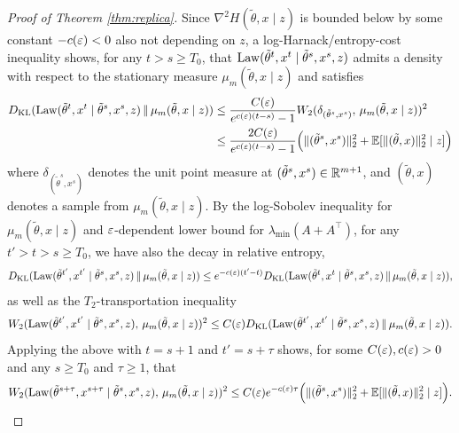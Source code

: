 \begin{proof}[Proof of Theorem \ref{thm:replica}]
Since $\nabla^2 H(\tilde\theta,x \mid z)$ is bounded below by some 
constant ${-}c(\varepsilon)<0$ also not depending on $z$,
a log-Harnack/entropy-cost inequality \cite[Corollary 1.2]{rockner2010log}
shows, for any $t>s \geq T_0$, that $\operatorname{Law}(\tilde \theta^t,x^t \mid \tilde \theta^s,x^s,z)$ admits a density
with respect to the stationary measure $\mu_m(\tilde\theta,x \mid z)$
and satisfies
\begin{align*}
D_{\mathrm{KL}}(\operatorname{Law}(\tilde \theta^t,x^t \mid \tilde \theta^s,x^s,z)\,\|\,\mu_m(\tilde\theta,x \mid z))
&\leq \frac{C(\varepsilon)}{e^{c(\varepsilon)(t-s)}-1}
W_2(\delta_{(\tilde \theta^s,x^s)},\,\mu_m(\tilde\theta,x \mid z))^2\\
&\leq \frac{2C(\varepsilon)}{e^{c(\varepsilon)(t-s)}-1}\Big(\|(\tilde \theta^s,x^s)\|_2^2
+\mathbb{E}[\|(\tilde\theta,x)\|_2^2 \mid z]\Big)
\end{align*}
where $\delta_{(\tilde \theta^s,x^s)}$ denotes the unit point measure
at $(\tilde \theta^s,x^s) \in \mathbb{R}^{m+1}$, and $(\tilde \theta,x)$ denotes a sample
from $\mu_m(\tilde \theta,x \mid z)$. By the log-Sobolev inequality for
$\mu_m(\tilde \theta,x \mid z)$ and $\varepsilon$-dependent lower bound for
$\lambda_{\min}(A+A^\top)$, for any
$t'>t>s \geq T_0$, we have also the decay in relative entropy, 
\begin{align*}
D_{\mathrm{KL}}(\operatorname{Law}(\tilde \theta^{t'},x^{t'} \mid \tilde \theta^s,x^s,z)\,\|\,\mu_m(\tilde\theta,x \mid z))
\leq e^{-c(\varepsilon)(t'-t)}
D_{\mathrm{KL}}(\operatorname{Law}(\tilde \theta^t,x^t \mid \tilde \theta^s,x^s,z)\,\|\,\mu_m(\tilde \theta,x \mid z)),
\end{align*}
as well as the $T_2$-transportation inequality \cite{otto2000generalization}
\[W_2(\operatorname{Law}(\tilde \theta^{t'},x^{t'} \mid \tilde \theta^s,x^s,z),\,\mu_m(\tilde\theta,x \mid z))^2
\leq C(\varepsilon)D_{\mathrm{KL}}(\operatorname{Law}(\tilde \theta^{t'},x^{t'} \mid \tilde \theta^s,x^s,z)\,\|\,\mu_m(\tilde\theta,x \mid z)).\]
Applying the above with $t=s+1$ and $t'=s+\tau$ shows, for some
$C(\varepsilon),c(\varepsilon)>0$ and any $s \geq T_0$ and $\tau \geq 1$, that
\begin{equation}\label{eq:auxwassersteincontraction}
W_2(\operatorname{Law}(\tilde \theta^{s+\tau},x^{s+\tau} \mid \tilde \theta^s,x^s,z),\,\mu_m(\tilde\theta,x \mid z))^2
\leq C(\varepsilon)e^{-c(\varepsilon)\tau}\Big(\|(\tilde \theta^s,x^s)\|_2^2
+\mathbb{E}[\|(\tilde\theta,x)\|_2^2 \mid z]\Big).
\end{equation}


\end{proof}

